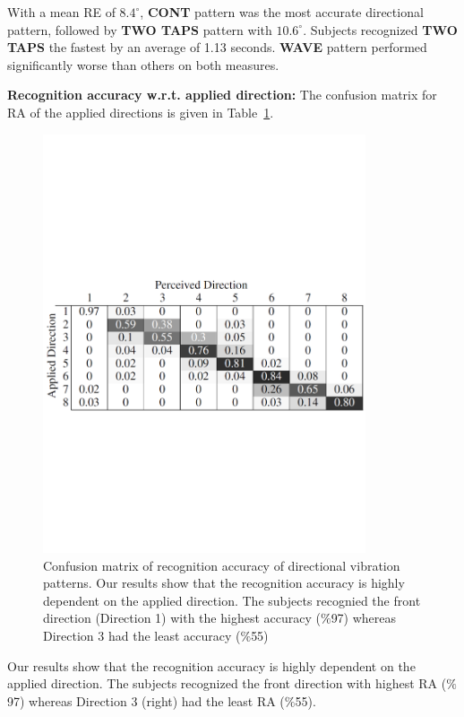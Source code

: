 With a mean RE of $8.4^{\circ}$, \textbf{CONT} pattern was the most accurate directional pattern, followed by \textbf{TWO TAPS} pattern with $10.6^{\circ}$. Subjects recognized \textbf{TWO TAPS} the fastest by an average of 1.13 seconds. \textbf{WAVE} pattern performed significantly worse than others on both measures.

\textbf{Recognition accuracy w.r.t. applied direction:}
The confusion matrix for RA of the applied directions is given in Table~\ref{fig:vibration_pattern_conf_matrix}.

\begin{figure}[ht!]
\centering
\includegraphics[width=0.85\textwidth]{pics/vibration_pattern_conf_matrix_cropped}
\caption{Confusion matrix of recognition accuracy of directional vibration patterns. Our results show that the recognition accuracy is highly dependent on the applied direction. The subjects recognied the front direction (Direction 1) with the highest accuracy ($\%$97) whereas Direction 3 had the least accuracy ($\%$55)}
\label{fig:vibration_pattern_conf_matrix}
\end{figure}

Our results show that the recognition accuracy is highly dependent on the applied direction. The subjects recognized the front direction with highest RA ($\%$97) whereas Direction 3 (right) had the least RA ($\%$55).

